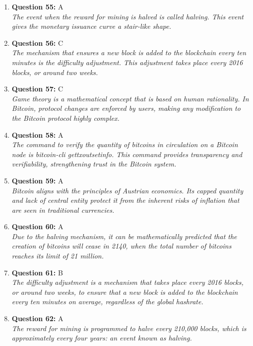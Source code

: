 \documentclass[12pt,a4paper]{article}
\begin{document}
\begin{enumerate}
\item \textbf{Question 55:} A
\\ \textit{The event when the reward for mining is halved is called halving. This event gives the monetary issuance curve a stair-like shape.}

\item \textbf{Question 56:} C
\\ \textit{The mechanism that ensures a new block is added to the blockchain every ten minutes is the difficulty adjustment. This adjustment takes place every 2016 blocks, or around two weeks.}

\item \textbf{Question 57:} C
\\ \textit{Game theory is a mathematical concept that is based on human rationality. In Bitcoin, protocol changes are enforced by users, making any modification to the Bitcoin protocol highly complex.}

\item \textbf{Question 58:} A
\\ \textit{The command to verify the quantity of bitcoins in circulation on a Bitcoin node is bitcoin-cli gettxoutsetinfo. This command provides transparency and verifiability, strengthening trust in the Bitcoin system.}

\item \textbf{Question 59:} A
\\ \textit{Bitcoin aligns with the principles of Austrian economics. Its capped quantity and lack of central entity protect it from the inherent risks of inflation that are seen in traditional currencies.}

\item \textbf{Question 60:} A
\\ \textit{Due to the halving mechanism, it can be mathematically predicted that the creation of bitcoins will cease in 2140, when the total number of bitcoins reaches its limit of 21 million.}

\item \textbf{Question 61:} B
\\ \textit{The difficulty adjustment is a mechanism that takes place every 2016 blocks, or around two weeks, to ensure that a new block is added to the blockchain every ten minutes on average, regardless of the global hashrate.}

\item \textbf{Question 62:} A
\\ \textit{The reward for mining is programmed to halve every 210,000 blocks, which is approximately every four years: an event known as halving.}


\end{enumerate}
\end{document}
